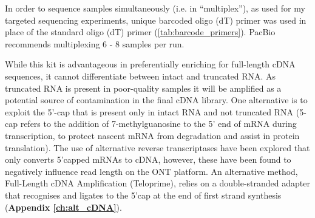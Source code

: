 In order to sequence samples simultaneously (i.e. in “multiplex”), as used for my targeted sequencing experiments, unique barcoded oligo (dT) primer was used in place of the standard oligo (dT) primer (\cref{tab:barcode_primers}). PacBio recommends multiplexing 6 - 8 samples per run.

While this kit is advantageous in preferentially enriching for full-length cDNA sequences, it cannot differentiate between intact and truncated RNA. As truncated RNA is present in poor-quality samples it will be amplified as a potential source of contamination in the final cDNA library. One alternative is to exploit the 5’-cap that is present only in intact RNA and not truncated RNA (5-cap refers to the addition of 7-methylguanosine to the 5’ end of mRNA during transcription, to protect nascent mRNA from degradation and assist in protein translation). The use of alternative reverse transcriptases have been explored that only converts 5’capped mRNAs to cDNA, however, these have been found to negatively influence read length on the ONT platform\cite{Cartolano2016}. An alternative method, Full-Length cDNA Amplification (Teloprime)\cite{Cartolano2016}, relies on a double-stranded adapter that recognises and ligates to the 5’cap at the end of first strand synthesis (\textbf{Appendix \ref{ch:alt_cDNA}}).

